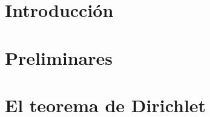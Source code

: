 \documentclass[12pt]{book}
\begin{document}

\setcounter{page}{1}
\chapter*{Introducción}

\blankpages
\chapter{Preliminares}

\blankpages
\chapter{El teorema de Dirichlet}


\nocite{*}
\blankpages


\end{document}
